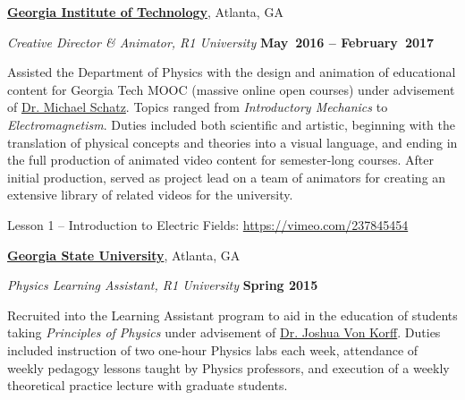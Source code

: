 \documentclass[10pt]{article}
\newcommand{\halfblankline}{\quad\vspace{-0.5\baselineskip}\pagebreak[3]}
\begin{document}
\href{https://www.gatech.edu/}{\textbf{Georgia Institute of Technology}},
Atlanta, GA
\begin{outerlist}
	
	\item[] \textit{Creative Director \& Animator, R1 University}%
	\hfill \textbf{May~2016 -- February~2017}
	\begin{innerlist}
			\item Assisted the Department of Physics with the design and animation of educational content for Georgia Tech MOOC (massive online open courses) under advisement of \href{https://physics.gatech.edu/user/michael-schatz} {Dr. Michael Schatz}. Topics ranged from \emph{Introductory Mechanics} to \emph{Electromagnetism}. Duties included both scientific and artistic, beginning with the translation of physical concepts and theories into a visual language, and ending in the full production of animated video content for semester-long courses. After initial production, served as project lead on a team of animators for creating an extensive library of related videos for the university.
			\item Lesson 1 -- Introduction to Electric Fields: \href{https://vimeo.com/237845454} {https://vimeo.com/237845454}
		\end{innerlist}
		
		\halfblankline
		
\end{outerlist}


\href{https://www.gsu.edu/}{\textbf{Georgia State University}},
Atlanta, GA
\begin{outerlist}
	
	\item[] \textit{Physics Learning Assistant, R1 University}%
	\hfill \textbf{Spring 2015}
	\begin{innerlist}
		\item Recruited into the Learning Assistant program to aid in the education of students taking \emph{Principles of Physics} under advisement of \href{https://www.researchgate.net/scientific-contributions/Joshua-Von-Korff-15134139} {Dr. Joshua Von Korff}. Duties included instruction of two one-hour Physics labs each week, attendance of weekly pedagogy lessons taught by Physics professors, and execution of a weekly theoretical practice lecture with graduate students.
	\end{innerlist}
	
	\halfblankline
	
\end{outerlist}
\end{document}
